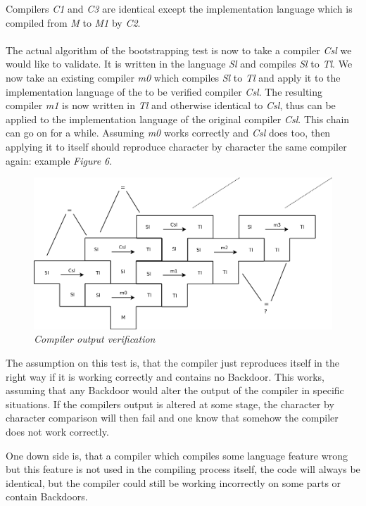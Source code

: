\documentclass[a4paper, 12pt]{article}
\begin{document}
Compilers \emph{C1} and \emph{C3} are identical except the implementation language which is compiled from \emph{M} to \emph{M1} by \emph{C2}.
\\
\\
The actual algorithm of the bootstrapping test is now to take a compiler \emph{Csl} we would like to validate. It is written in the language \emph{Sl} and compiles \emph{Sl} to \emph{Tl}. We now take an existing compiler \emph{m0} which compiles \emph{Sl} to \emph{Tl} and apply it to the implementation language of the to be verified compiler \emph{Csl}. The resulting compiler \emph{m1} is now written in \emph{Tl} and otherwise identical to \emph{Csl}, thus can be applied to the implementation language of the original compiler \emph{Csl}. This chain can go on for a while. Assuming \emph{m0} works correctly and \emph{Csl} does too, then applying it to itself should reproduce character by character the same compiler again: example \emph{Figure 6}.

\begin{figure}[h]
\begin{center}
\includegraphics[keepaspectratio=true, scale=0.4]{T_diagram_bootstrapping.png}
\end{center}
\caption{\emph{Compiler output verification}}
\end{figure}

The assumption on this test is, that the compiler just reproduces itself in the right way if it is working correctly and contains no Backdoor.
This works, assuming that any Backdoor would alter the output of the compiler in specific situations. If the compilers output is altered at some stage, the character by character comparison will then fail and one know that somehow the compiler does not work correctly.

One down side is, that a compiler which compiles some language feature wrong but this feature is not used in the compiling process itself, the code will always be identical, but the compiler could still be working incorrectly on some parts or contain Backdoors.
\end{document}
